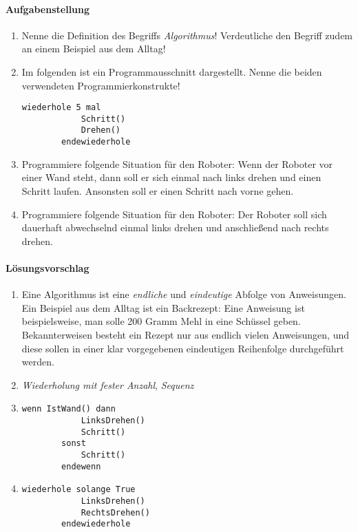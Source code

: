 \paragraph{Aufgabenstellung}
\begin{enumerate}
	\item
		Nenne die Definition des Begriffs \emph{Algorithmus}! 
		Verdeutliche den Begriff zudem an einem Beispiel aus dem Alltag!
	\item
		Im folgenden ist ein Programmausschnitt dargestellt. Nenne die
		beiden verwendeten Programmierkonstrukte!
		\begin{lstlisting}[language=robotkarol]
		wiederhole 5 mal
			Schritt()
			Drehen()
		endewiederhole
		\end{lstlisting}
	\item
		Programmiere folgende Situation für den Roboter: Wenn der
		Roboter vor einer Wand steht, dann soll er sich einmal nach
		links drehen und einen Schritt laufen. Ansonsten soll er einen
		Schritt nach vorne gehen.
	\item
		Programmiere folgende Situation für den Roboter: Der Roboter
		soll sich dauerhaft abwechselnd einmal links drehen und
		anschließend nach rechts drehen.
\end{enumerate}
\par
\paragraph{Lösungsvorschlag}
\begin{enumerate}
	\item
		Eine Algorithmus ist eine \emph{endliche} und \emph{eindeutige} Abfolge von
		Anweisungen. Ein Beispiel aus dem Alltag ist ein Backrezept:
		Eine Anweisung ist beispielsweise, man solle 200 Gramm Mehl in
		eine Schüssel geben. Bekannterweisen besteht ein Rezept nur aus
		endlich vielen Anweisungen, und diese sollen in einer klar
		vorgegebenen eindeutigen Reihenfolge durchgeführt werden.
	\item
		\emph{Wiederholung mit fester Anzahl}, \emph{Sequenz}
	\item
		\begin{lstlisting}[language=robotkarol]
		wenn IstWand() dann
			LinksDrehen()
			Schritt()
		sonst
			Schritt()
		endewenn
		\end{lstlisting}

	\item
		\begin{lstlisting}[language=robotkarol]
		wiederhole solange True
			LinksDrehen()
			RechtsDrehen()
		endewiederhole
		\end{lstlisting}

\end{enumerate}
\par

